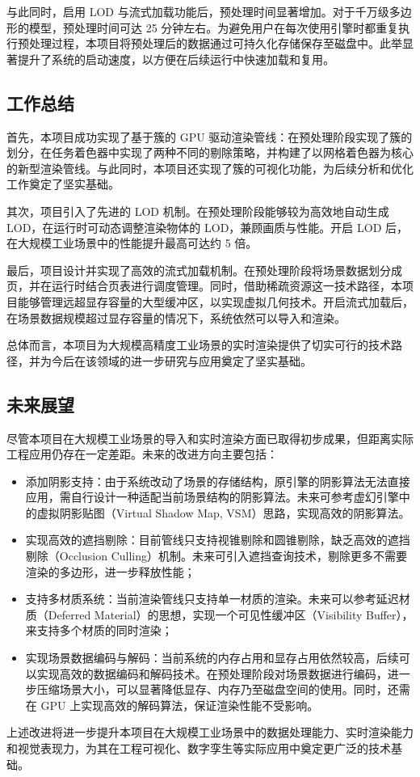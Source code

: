 与此同时，启用 LOD 与流式加载功能后，预处理时间显著增加。对于千万级多边形的模型，预处理时间可达 25 分钟左右。为避免用户在每次使用引擎时都重复执行预处理过程，本项目将预处理后的数据通过可持久化存储保存至磁盘中\cite{cereal}。此举显著提升了系统的启动速度，以方便在后续运行中快速加载和复用。

\subsection{工作总结}

首先，本项目成功实现了基于簇的 GPU 驱动渲染管线：在预处理阶段实现了簇的划分，在任务着色器中实现了两种不同的剔除策略，并构建了以网格着色器为核心的新型渲染管线。与此同时，本项目还实现了簇的可视化功能，为后续分析和优化工作奠定了坚实基础。

其次，项目引入了先进的 LOD 机制。在预处理阶段能够较为高效地自动生成 LOD，在运行时可动态调整渲染物体的 LOD，兼顾画质与性能。开启 LOD 后，在大规模工业场景中的性能提升最高可达约 5 倍。

最后，项目设计并实现了高效的流式加载机制。在预处理阶段将场景数据划分成页，并在运行时结合页表进行调度管理。同时，借助稀疏资源这一技术路径，本项目能够管理远超显存容量的大型缓冲区，以实现虚拟几何技术。开启流式加载后，在场景数据规模超过显存容量的情况下，系统依然可以导入和渲染。

总体而言，本项目为大规模高精度工业场景的实时渲染提供了切实可行的技术路径，并为今后在该领域的进一步研究与应用奠定了坚实基础。

\subsection{未来展望}

尽管本项目在大规模工业场景的导入和实时渲染方面已取得初步成果，但距离实际工程应用仍存在一定差距。未来的改进方向主要包括：

\begin{itemize}
    \item 添加阴影支持：由于系统改动了场景的存储结构，原引擎的阴影算法无法直接应用，需自行设计一种适配当前场景结构的阴影算法。未来可参考虚幻引擎中的虚拟阴影贴图（Virtual Shadow Map, VSM）思路\cite{VSM}，实现高效的阴影算法。

    \item 实现高效的遮挡剔除：目前管线只支持视锥剔除和圆锥剔除，缺乏高效的遮挡剔除（Occlusion Culling）机制。未来可引入遮挡查询技术，剔除更多不需要渲染的多边形，进一步释放性能\cite{coorg1997}；

    \item 支持多材质系统：当前渲染管线只支持单一材质的渲染。未来可以参考延迟材质（Deferred Material）的思想，实现一个可见性缓冲区（Visibility Buffer），来支持多个材质的同时渲染\cite{burns2013}；

    \item 实现场景数据编码与解码：当前系统的内存占用和显存占用依然较高，后续可以实现高效的数据编码和解码技术。在预处理阶段对场景数据进行编码，进一步压缩场景大小，可以显著降低显存、内存乃至磁盘空间的使用\cite{Mlakar2024}。同时，还需在 GPU 上实现高效的解码算法，保证渲染性能不受影响。
\end{itemize}

上述改进将进一步提升本项目在大规模工业场景中的数据处理能力、实时渲染能力和视觉表现力，为其在工程可视化、数字孪生等实际应用中奠定更广泛的技术基础。